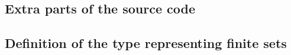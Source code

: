 \begin{appendices}

\chapter{Extra parts of the source code}
\label{apx:codes}


\section{Definition of the type representing finite sets}
\begin{code}
    \>[0]\AgdaSpace{}%
    \AgdaSpace{}%
    \AgdaSymbol{:}\AgdaSpace{}%
    \AgdaSpace{}%
    \AgdaSpace{}%
    \AgdaSpace{}%
    \<%
    \\
    \>[0][@{}l@{\AgdaIndent{0}}]%
    \>[2]\AgdaSpace{}%
    \AgdaSymbol{:}\AgdaSpace{}%
    \AgdaSymbol{\{}\AgdaSpace{}%
    \AgdaSymbol{:}\AgdaSpace{}%
    \AgdaSymbol{\}}\AgdaSpace{}%
    \AgdaSpace{}%
    \AgdaSpace{}%
    \AgdaSymbol{(}\AgdaSpace{}%
    \AgdaSymbol{)}\<%
    \\
    \>[2]%
    \>[7]\AgdaSymbol{:}\AgdaSpace{}%
    \AgdaSymbol{\{}\AgdaSpace{}%
    \AgdaSymbol{:}\AgdaSpace{}%
    \AgdaSymbol{\}}\AgdaSpace{}%
    \AgdaSymbol{(}\AgdaSpace{}%
    \AgdaSymbol{:}\AgdaSpace{}%
    \AgdaSpace{}%
    \AgdaSymbol{)}\AgdaSpace{}%
    \AgdaSpace{}%
    \AgdaSpace{}%
    \AgdaSymbol{(}\AgdaSpace{}%
    \AgdaSymbol{)}\<%
\end{code}


\end{appendices}
